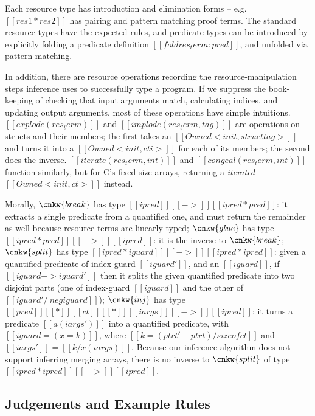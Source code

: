 \documentclass[11pt]{article}%
\begin{document}
Each resource type has introduction and elimination forms -- e.g.
$[[ res1 * res2 ]]$ has pairing and pattern matching proof terms. The
standard resource types have the expected rules, and predicate types
can be introduced by explicitly folding a predicate definition
$[[ fold res_term : pred ]]$, and unfolded via pattern-matching.


In addition, there are resource operations recording the
resource-manipulation steps inference uses to successfully type a
program.  If we suppress the book-keeping of checking that input
arguments match, calculating indices, and updating output arguments,
most of these operations have simple intuitions.
%
$[[ explode ( res_term ) ]]$ and $[[ implode ( res_term , tag ) ]]$
are operations on structs and their members; the first takes an
$[[ Owned < init , struct tag > ]]$ and turns it into a
$[[ Owned < init , cti > ]]$ for each of its members; the second does the
inverse.  $[[ iterate ( res_term , int ) ]]$ and
$[[ congeal ( res_term , int ) ]]$ function similarly, but for C's
fixed-size arrays, returning a \emph{iterated} $[[ Owned < init , ct > ]]$
instead.

Morally,
$\cnkw{break}$ has type $[[ ipred ]] [[ -> ]] [[ ipred * pred ]]$: it
extracts a single predicate from a quantified one, and must return the
remainder as well because resource terms are linearly typed;
$\cnkw{glue}$ has type $[[ ipred * pred ]] [[ -> ]] [[ ipred ]]$: it
is the inverse to $\cnkw{break}$; $\cnkw{split}$ has type
$[[ ipred * iguard ]] [[ -> ]] [[ ipred * ipred ]]$: given a
quantified predicate of index-guard $[[ iguard' ]]$, and an
$[[ iguard ]]$, if $[[ iguard -> iguard' ]]$ then it splits the given
quantified predicate into two disjoint parts (one of index-guard
$[[ iguard ]]$ and the other of $[[ iguard' /\ neg iguard ]]$);
$\cnkw{inj}$ has type
$[[ pred ]] [[ * ]] [[ ct ]] [[ * ]] [[ iargs ]] [[ -> ]] [[ ipred ]]$:
it turns a predicate $[[ a ( iargs' ) ]]$ into a quantified
predicate, with $[[ iguard = ( x = k ) ]]$, where
$[[ k = ( ptrt' - ptrt ) / sizeof ct ]]$ and
$[[ iargs' ]] = [[ k / x ( iargs ) ]]$. Because our inference
algorithm does not support inferring merging
arrays, there is no inverse to
$\cnkw{split}$ of type $[[ ipred * ipred ]] [[ -> ]] [[ ipred ]]$.

\subsection{Judgements and Example Rules}
\label{subsec:judgm_eg_rules}
\end{document}
